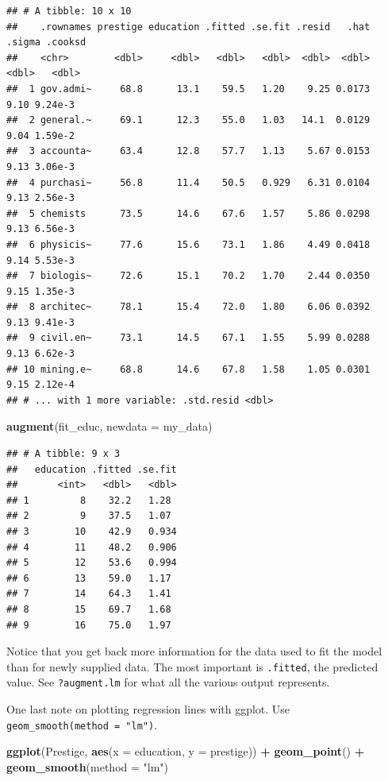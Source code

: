 \documentclass[12pt,oneside,openany]{book}
\newenvironment{Shaded}{\begin{snugshade}}{\end{snugshade}}
\newcommand{\KeywordTok}[1]{\textcolor[rgb]{0.13,0.29,0.53}{\textbf{#1}}}
\newcommand{\DataTypeTok}[1]{\textcolor[rgb]{0.13,0.29,0.53}{#1}}
\newcommand{\StringTok}[1]{\textcolor[rgb]{0.31,0.60,0.02}{#1}}
\newcommand{\OperatorTok}[1]{\textcolor[rgb]{0.81,0.36,0.00}{\textbf{#1}}}
\newcommand{\NormalTok}[1]{#1}
\begin{document}
\begin{verbatim}
## # A tibble: 10 x 10
##    .rownames prestige education .fitted .se.fit .resid   .hat .sigma .cooksd
##    <chr>        <dbl>     <dbl>   <dbl>   <dbl>  <dbl>  <dbl>  <dbl>   <dbl>
##  1 gov.admi~     68.8      13.1    59.5   1.20    9.25 0.0173   9.10 9.24e-3
##  2 general.~     69.1      12.3    55.0   1.03   14.1  0.0129   9.04 1.59e-2
##  3 accounta~     63.4      12.8    57.7   1.13    5.67 0.0153   9.13 3.06e-3
##  4 purchasi~     56.8      11.4    50.5   0.929   6.31 0.0104   9.13 2.56e-3
##  5 chemists      73.5      14.6    67.6   1.57    5.86 0.0298   9.13 6.56e-3
##  6 physicis~     77.6      15.6    73.1   1.86    4.49 0.0418   9.14 5.53e-3
##  7 biologis~     72.6      15.1    70.2   1.70    2.44 0.0350   9.15 1.35e-3
##  8 architec~     78.1      15.4    72.0   1.80    6.06 0.0392   9.13 9.41e-3
##  9 civil.en~     73.1      14.5    67.1   1.55    5.99 0.0288   9.13 6.62e-3
## 10 mining.e~     68.8      14.6    67.8   1.58    1.05 0.0301   9.15 2.12e-4
## # ... with 1 more variable: .std.resid <dbl>
\end{verbatim}

\begin{Shaded}
\begin{Highlighting}[]
\KeywordTok{augment}\NormalTok{(fit_educ,}
        \DataTypeTok{newdata =}\NormalTok{ my_data)}
\end{Highlighting}
\end{Shaded}

\begin{verbatim}
## # A tibble: 9 x 3
##   education .fitted .se.fit
##       <int>   <dbl>   <dbl>
## 1         8    32.2   1.28 
## 2         9    37.5   1.07 
## 3        10    42.9   0.934
## 4        11    48.2   0.906
## 5        12    53.6   0.994
## 6        13    59.0   1.17 
## 7        14    64.3   1.41 
## 8        15    69.7   1.68 
## 9        16    75.0   1.97
\end{verbatim}

Notice that you get back more information for the data used to fit the
model than for newly supplied data. The most important is
\texttt{.fitted}, the predicted value. See \texttt{?augment.lm} for what
all the various output represents.

One last note on plotting regression lines with ggplot. Use
\texttt{geom\_smooth(method\ =\ "lm")}.

\begin{Shaded}
\begin{Highlighting}[]
\KeywordTok{ggplot}\NormalTok{(Prestige, }\KeywordTok{aes}\NormalTok{(}\DataTypeTok{x =}\NormalTok{ education, }\DataTypeTok{y =}\NormalTok{ prestige)) }\OperatorTok{+}
\StringTok{  }\KeywordTok{geom_point}\NormalTok{() }\OperatorTok{+}
\StringTok{  }\KeywordTok{geom_smooth}\NormalTok{(}\DataTypeTok{method =} \StringTok{"lm"}\NormalTok{)}
\end{Highlighting}
\end{Shaded}
\end{document}
